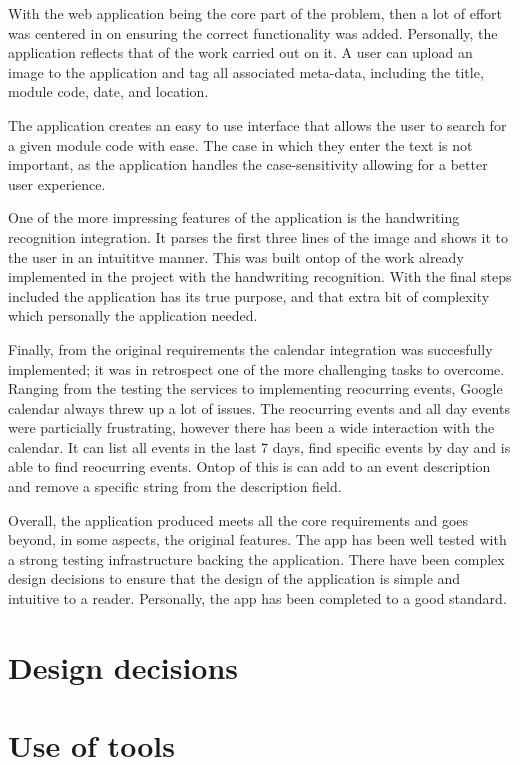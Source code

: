 With the web application being the core part of the problem, then a lot of effort was centered in on ensuring the correct functionality was added. Personally, the application reflects that of the work carried out on it. A user can upload an image to the application and tag all associated meta-data, including the title, module code, date, and location.

The application creates an easy to use interface that allows the user to search for a given module code with ease. The case in which they enter the text is not important, as the application handles the case-sensitivity allowing for a better user experience.

One of the more impressing features of the application is the handwriting recognition integration. It parses the first three lines of the image and shows it to the user in an intuititve manner. This was built ontop of the work already implemented in the project with the handwriting recognition. With the final steps included the application has its true purpose, and that extra bit of complexity which personally the application needed.

Finally, from the original requirements the calendar integration was succesfully implemented; it was in retrospect one of the more challenging tasks to overcome. Ranging from the testing the services to implementing reocurring events, Google calendar always threw up a lot of issues. The reocurring events and all day events were particially frustrating, however there has been a wide interaction with the calendar. It can list all events in the last 7 days, find specific events by day and is able to find reocurring events. Ontop of this is can add to an event description and remove a specific string from the description field.

Overall, the application produced meets all the core requirements and goes beyond, in some aspects, the original features. The app has been well tested with a strong testing infrastructure backing the application. There have been complex design decisions to ensure that the design of the application is simple and intuitive to a reader. Personally, the app has been completed to a good standard.

\section{Design decisions}

\section{Use of tools}
